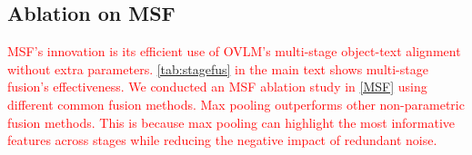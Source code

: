 \begin{table}[t]
    \centering
    \caption{Ablation on shot fusion mode. Best results are marked in \textbf{bold}.}
    \label{tab:shotfus}
\end{table}

\subsection{Ablation on MSF}
\textcolor{red}{MSF’s innovation is its efficient use of OVLM’s multi-stage object-text alignment without extra parameters. \cref{tab:stagefus} in the main text shows multi-stage fusion’s effectiveness. We conducted an MSF ablation study in \cref{MSF} using different common fusion methods. Max pooling outperforms other non-parametric fusion methods. This is because max pooling can highlight the most informative features across stages while reducing the negative impact of redundant noise.}

\begin{table}[h]
\centering
\label{MSF}
\caption{Ablation on MSF. Best results are marked in \textbf{bold}.}
\end{table}


